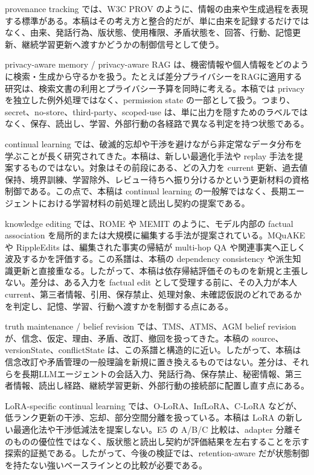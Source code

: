 \documentclass[12pt,a4paper]{article}
\begin{document}
provenance tracking では、W3C PROV のように、情報の由来や生成過程を表現する標準がある。本稿はその考え方と整合的だが、単に由来を記録するだけではなく、由来、発話行為、版状態、使用権限、矛盾状態を、回答、行動、記憶更新、継続学習更新へ渡すかどうかの制御信号として使う。

privacy-aware memory / privacy-aware RAG は、機密情報や個人情報をどのように検索・生成から守るかを扱う。たとえば差分プライバシーをRAGに適用する研究は、検索文書の利用とプライバシー予算を同時に考える。本稿では privacy を独立した例外処理ではなく、permission state の一部として扱う。つまり、secret、no-store、third-party、scoped-use は、単に出力を隠すためのラベルではなく、保存、読出し、学習、外部行動の各経路で異なる判定を持つ状態である。

continual learning では、破滅的忘却や干渉を避けながら非定常なデータ分布を学ぶことが長く研究されてきた。本稿は、新しい最適化手法や replay 手法を提案するものではない。対象はその前段にある、どの入力を current 更新、過去値保持、境界訓練、学習除外、レビュー待ちへ振り分けるかという更新材料の資格制御である。この点で、本稿は continual learning の一般解ではなく、長期エージェントにおける学習材料の前処理と読出し契約の提案である。

knowledge editing では、ROME や MEMIT のように、モデル内部の factual association を局所的または大規模に編集する手法が提案されている。MQuAKE や RippleEdits は、編集された事実の帰結が multi-hop QA や関連事実へ正しく波及するかを評価する。この系譜は、本稿の dependency consistency や派生知識更新と直接重なる。したがって、本稿は依存帰結評価そのものを新規と主張しない。差分は、ある入力を factual edit として受理する前に、その入力が本人 current、第三者情報、引用、保存禁止、処理対象、未確認仮説のどれであるかを判定し、記憶、学習、行動へ渡すかを制御する点にある。

truth maintenance / belief revision では、TMS、ATMS、AGM belief revision が、信念、仮定、理由、矛盾、改訂、撤回を扱ってきた。本稿の source、versionState、conflictState は、この系譜と構造的に近い。したがって、本稿は信念改訂や矛盾管理の一般理論を新規に置き換えるものではない。差分は、それらを長期LLMエージェントの会話入力、発話行為、保存禁止、秘密情報、第三者情報、読出し経路、継続学習更新、外部行動の接続部に配置し直す点にある。

LoRA-specific continual learning では、O-LoRA、InfLoRA、C-LoRA などが、低ランク更新の干渉、忘却、部分空間分離を扱っている。本稿は LoRA の新しい最適化法や干渉低減法を提案しない。E5 の A/B/C 比較は、adapter 分離そのものの優位性ではなく、版状態と読出し契約が評価結果を左右することを示す探索的証拠である。したがって、今後の検証では、retention-aware だが状態制御を持たない強いベースラインとの比較が必要である。
\end{document}
